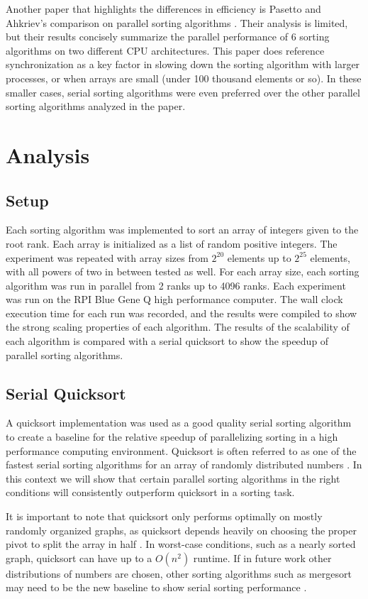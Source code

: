 \documentclass[10pt,letterpaper]{article}
\begin{document}
\begin{multicols}{2}
Another paper that highlights the differences in efficiency is Pasetto and Ahkriev's comparison on parallel sorting algorithms \cite{Pasetto:2011:CSP:2048147.2048207}. Their analysis is limited, but their results concisely summarize the parallel performance of 6 sorting algorithms on two different CPU architectures. This paper does reference synchronization as a key factor in slowing down the sorting algorithm with larger processes, or when arrays are small (under 100 thousand elements or so). In these smaller cases, serial sorting algorithms were even preferred over the other parallel sorting algorithms analyzed in the paper.

\section{Analysis}
\subsection{Setup}
Each sorting algorithm was implemented to sort an array of integers given to the root rank. Each array is initialized as a list of random positive integers. The experiment was repeated with array sizes from $2^{20}$ elements up to $2^{25}$ elements, with all powers of two in between tested as well. For each array size, each sorting algorithm was run in parallel from 2 ranks up to 4096 ranks. Each experiment was run on the RPI Blue Gene Q high performance computer. The wall clock execution time for each run was recorded, and the results were compiled to show the strong scaling properties of each algorithm. The results of the scalability of each algorithm is compared with a serial quicksort to show the speedup of parallel sorting algorithms.
\subsection{Serial Quicksort}
A quicksort implementation was used as a good quality serial sorting algorithm to create a baseline for the relative speedup of parallelizing sorting in a high performance computing environment. Quicksort is often referred to as one of the fastest serial sorting algorithms for an array of randomly distributed numbers \cite{10.1093/comjnl/5.1.10}. In this context we will show that certain parallel sorting algorithms in the right conditions will consistently outperform quicksort in a sorting task.

It is important to note that quicksort only performs optimally on mostly randomly organized graphs, as quicksort depends heavily on choosing the proper pivot to split the array in half \cite{10.1093/comjnl/5.1.10}. In worst-case conditions, such as a nearly sorted graph, quicksort can have up to a $O(n^2)$ runtime. If in future work other distributions of numbers are chosen, other sorting algorithms such as mergesort may need to be the new baseline to show serial sorting performance \cite{Knuth:1998:ACP:280635}.

\end{multicols}
\end{document}

